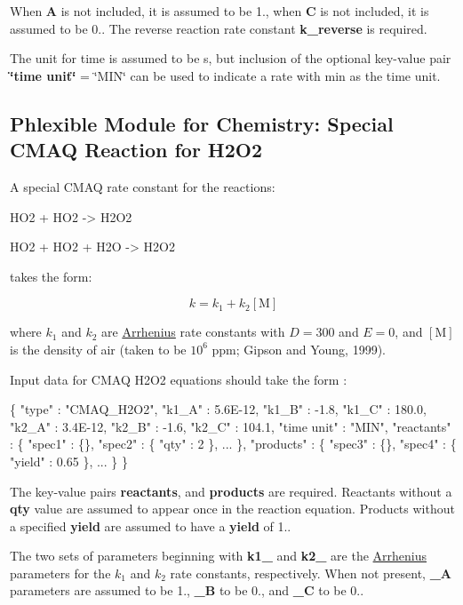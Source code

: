 When {\bfseries A} is not included, it is assumed to be 1., when {\bfseries C} is not included, it is assumed to be 0.. The reverse reaction rate constant {\bfseries k\+\_\+reverse} is required.

The unit for time is assumed to be s, but inclusion of the optional key-\/value pair {\bfseries \char`\"{}time unit\char`\"{}} = \char`\"{}\+M\+I\+N\char`\"{} can be used to indicate a rate with min as the time unit. \hypertarget{phlex_rxn_CMAQ_H2O2}{}\subsection{Phlexible Module for Chemistry\+: Special C\+M\+AQ Reaction for H2\+O2}\label{phlex_rxn_CMAQ_H2O2}
A special C\+M\+AQ rate constant for the reactions\+:

\begin{ch} HO2 + HO2 -> H2O2 \end{ch} \begin{ch} HO2 + HO2 + H2O -> H2O2 \end{ch}

takes the form\+:

\[ k=k_1+k_2[\mbox{M}] \]

where $k_1$ and $k_2$ are \mbox{\hyperlink{phlex_rxn_arrhenius}{Arrhenius}} rate constants with $D=300$ and $E=0$, and $[\mbox{M}]$ is the density of air (taken to be $10^6$ ppm; Gipson and Young, 1999).

Input data for C\+M\+AQ H2\+O2 equations should take the form \+: 
\begin{DoxyCode}
\{
  "type" : "CMAQ\_H2O2",
  "k1\_A" : 5.6E-12,
  "k1\_B" : -1.8,
  "k1\_C" : 180.0,
  "k2\_A" : 3.4E-12,
  "k2\_B" : -1.6,
  "k2\_C" : 104.1,
  "time unit" : "MIN",
  "reactants" : \{
    "spec1" : \{\},
    "spec2" : \{ "qty" : 2 \},
    ...
  \},
  "products" : \{
    "spec3" : \{\},
    "spec4" : \{ "yield" : 0.65 \},
    ...
  \}
\}
\end{DoxyCode}
 The key-\/value pairs {\bfseries reactants}, and {\bfseries products} are required. Reactants without a {\bfseries qty} value are assumed to appear once in the reaction equation. Products without a specified {\bfseries yield} are assumed to have a {\bfseries yield} of 1..

The two sets of parameters beginning with {\bfseries k1\+\_\+} and {\bfseries k2\+\_\+} are the \mbox{\hyperlink{phlex_rxn_arrhenius}{Arrhenius}} parameters for the $k_1$ and $k_2$ rate constants, respectively. When not present, {\bfseries \+\_\+A} parameters are assumed to be 1., {\bfseries \+\_\+B} to be 0., and {\bfseries \+\_\+C} to be 0..

